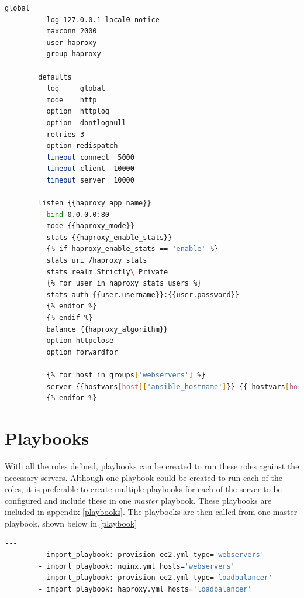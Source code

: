 \documentclass[a4paper]{article}
\begin{document}
 		\begin{minipage}{\textwidth}
      \begin{lstlisting}[caption={haproxy/templates/haproxy.cfg},label=haproxy-cfg,language=bash]
        global
          log 127.0.0.1 local0 notice
          maxconn 2000
          user haproxy
          group haproxy
        
        defaults
          log     global
          mode    http
          option  httplog
          option  dontlognull
          retries 3
          option redispatch
          timeout connect  5000
          timeout client  10000
          timeout server  10000
        
        listen {{haproxy_app_name}} 
          bind 0.0.0.0:80
          mode {{haproxy_mode}}
          stats {{haproxy_enable_stats}}
          {% if haproxy_enable_stats == 'enable' %}
          stats uri /haproxy_stats
          stats realm Strictly\ Private
          {% for user in haproxy_stats_users %}
          stats auth {{user.username}}:{{user.password}}
          {% endfor %}
          {% endif %}
          balance {{haproxy_algorithm}}
          option httpclose
          option forwardfor 
          
          {% for host in groups['webservers'] %}
          server {{hostvars[host]['ansible_hostname']}} {{ hostvars[host]['ansible_eth0']['ipv4']['address'] }}:80 check
          {% endfor %}
      \end{lstlisting}
    \end{minipage}
    
  \section{Playbooks}
    With all the roles defined, playbooks can be created to run these roles against the necessary servers. Although one playbook could be created to run each of the roles, it is preferable to create multiple playbooks for each of the server to be configured and include these in one \textit{master} playbook. These playbooks are included in appendix \ref{playbooks}.
    The playbooks are then called from one master playbook, shown below in \autoref{playbook}
    
    \noindent
    \begin{minipage}{\textwidth}
      \begin{lstlisting}[caption={main-playbook.yml},label=playbook,language=bash]
        ---
        - import_playbook: provision-ec2.yml type='webservers'
        - import_playbook: nginx.yml hosts='webservers'
        - import_playbook: provision-ec2.yml type='loadbalancer'
        - import_playbook: haproxy.yml hosts='loadbalancer'
      \end{lstlisting}
    \end{minipage}
    
\end{document}
